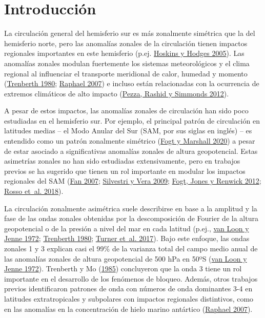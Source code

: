 \documentclass[12pt,oneside,a4paper]{reedthesis}
\begin{document}
  \listoftables

  \listoffigures


\mainmatter %
\pagestyle{fancyplain} %

\hypertarget{intro}{%
\chapter{Introducción}\label{intro}}

La circulación general del hemisferio sur es más zonalmente simétrica que la del hemisferio norte, pero las anomalías zonales de la circulación tienen impactos regionales importantes en este hemisferio (p.ej. \protect\hyperlink{ref-hoskins2005}{Hoskins y Hodges 2005}).
Las anomalías zonales modulan fuertemente los sistemas meteorológicos y el clima regional al influenciar el transporte meridional de calor, humedad y momento (\protect\hyperlink{ref-trenberth1980a}{Trenberth 1980}; \protect\hyperlink{ref-raphael2007}{Raphael 2007}) e incluso están relacionadas con la ocurrencia de extremos climáticos de alto impacto (\protect\hyperlink{ref-pezza2012}{Pezza, Rashid y Simmonds 2012}).

A pesar de estos impactos, las anomalías zonales de circulación han sido poco estudiadas en el hemisferio sur.
Por ejemplo, el principal patrón de circulación en latitudes medias -- el Modo Anular del Sur (SAM, por sus siglas en inglés) -- es entendido como un patrón zonalmente simétrico (\protect\hyperlink{ref-fogt2020}{Fogt y Marshall 2020}) a pesar de estar asociado a significativas anomalías zonales de altura geopotencial.
Estas asimetrías zonales no han sido estudiadas extensivamente, pero en trabajos previos se ha sugerido que tienen un rol importante en modular los impactos regionales del SAM (\protect\hyperlink{ref-fan2007}{Fan 2007}; \protect\hyperlink{ref-silvestri2009}{Silvestri y Vera 2009}; \protect\hyperlink{ref-fogt2012}{Fogt, Jones y Renwick 2012}; \protect\hyperlink{ref-rosso2018}{Rosso et~al. 2018}).

La circulación zonalmente asimétrica suele describirse en base a la amplitud y la fase de las ondas zonales obtenidas por la descomposición de Fourier de la altura geopotencial o de la presión a nivel del mar en cada latitud (p.ej., \protect\hyperlink{ref-vanloon1972}{van Loon y Jenne 1972}; \protect\hyperlink{ref-trenberth1980a}{Trenberth 1980}; \protect\hyperlink{ref-turner2017}{Turner et~al. 2017}).
Bajo este enfoque, las ondas zonales 1 y 3 explican casi el 99\% de la varianza total del campo medio anual de las anomalías zonales de altura geopotencial de 500 hPa en 50ºS (\protect\hyperlink{ref-vanloon1972}{van Loon y Jenne 1972}).
Trenberth y Mo (\protect\hyperlink{ref-trenberth1985}{1985}) concluyeron que la onda 3 tiene un rol importante en el desarrollo de los fenómenos de bloqueo.
Además, otros trabajos previos identificaron patrones de onda con números de onda dominantes 3-4 en latitudes extratropicales y subpolares con impactos regionales distintivos, como en las anomalías en la concentración de hielo marino antártico (\protect\hyperlink{ref-raphael2007}{Raphael 2007}).
\end{document}
